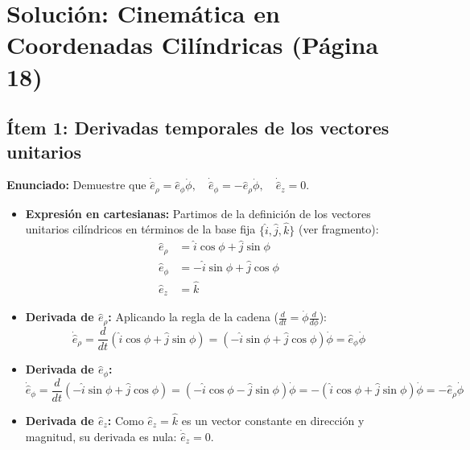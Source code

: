 \documentclass[a4paper]{article}
\begin{document}
\section*{Solución: Cinemática en Coordenadas Cilíndricas (Página 18)}

\subsection*{Ítem 1: Derivadas temporales de los vectores unitarios}
\textbf{Enunciado:} Demuestre que $\dot{\hat{e}}_\rho = \hat{e}_\phi \dot{\phi}, \quad \dot{\hat{e}}_\phi = -\hat{e}_\rho \dot{\phi}, \quad \dot{\hat{e}}_z = 0$.

\begin{itemize}
    \item \textbf{Expresión en cartesianas:} Partimos de la definición de los vectores unitarios cilíndricos en términos de la base fija $\{\hat{i}, \hat{j}, \hat{k}\}$ (ver fragmento):
    \begin{align*}
        \hat{e}_\rho &= \hat{i} \cos\phi + \hat{j} \sin\phi \\
        \hat{e}_\phi &= -\hat{i} \sin\phi + \hat{j} \cos\phi \\
        \hat{e}_z &= \hat{k}
    \end{align*}
    
    \item \textbf{Derivada de $\hat{e}_\rho$:} Aplicando la regla de la cadena ($\frac{d}{dt} = \dot{\phi} \frac{d}{d\phi}$):
    \begin{equation*}
        \dot{\hat{e}}_\rho = \frac{d}{dt}(\hat{i} \cos\phi + \hat{j} \sin\phi) = (-\hat{i} \sin\phi + \hat{j} \cos\phi) \dot{\phi} = \hat{e}_\phi \dot{\phi} \text{}
    \end{equation*}
    
    \item \textbf{Derivada de $\hat{e}_\phi$:}
    \begin{equation*}
        \dot{\hat{e}}_\phi = \frac{d}{dt}(-\hat{i} \sin\phi + \hat{j} \cos\phi) = (-\hat{i} \cos\phi - \hat{j} \sin\phi) \dot{\phi} = -(\hat{i} \cos\phi + \hat{j} \sin\phi) \dot{\phi} = -\hat{e}_\rho \dot{\phi} \text{}
    \end{equation*}
    
    \item \textbf{Derivada de $\hat{e}_z$:} Como $\hat{e}_z = \hat{k}$ es un vector constante en dirección y magnitud, su derivada es nula: $\dot{\hat{e}}_z = 0$.
\end{itemize}
\end{document}
